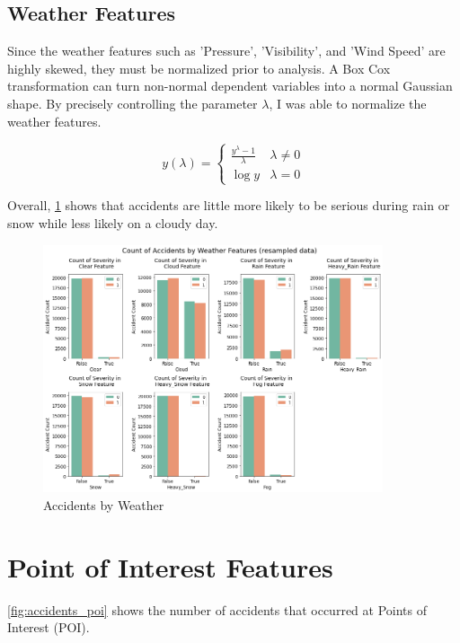 \subsection{Weather Features}
Since the weather features such as 'Pressure', 'Visibility', and 'Wind Speed' are highly skewed, they must be normalized prior to analysis. A Box Cox transformation \citep{osborne2010improving} can turn non-normal dependent variables into a normal Gaussian shape. By precisely controlling the parameter \(\lambda\), I was able to normalize the weather features.

\begin{equation} \label{eq:boxcox_transform}
    y(\lambda)=
    \begin{cases}
        \frac{y^\lambda - 1}{\lambda} & \lambda \neq 0 \\
        \log{y} & \lambda = 0
    \end{cases}
\end{equation}

Overall, \cref{fig:bar_weather} shows that accidents are little more likely to be serious during rain or snow while less likely on a cloudy day.

\begin{figure}[H]
    \centering
    \includegraphics[width=100mm,height=\textheight,keepaspectratio]{images/bar_weather.png}
    \caption{Accidents by Weather}
    \label{fig:bar_weather}
\end{figure}

\section{Point of Interest Features}
\noindent
\cref{fig:accidents_poi} shows the number of accidents that occurred at Points of Interest (POI).

